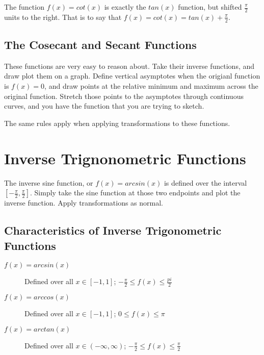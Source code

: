The function $f(x)=cot(x)$ is exactly the $tan(x)$ function, but shifted
$\frac{\pi}{2}$ units to the right.  That is to say that
$f(x)=cot(x)=tan(x)+\frac{\pi}{2}$.

\subsection{The Cosecant and Secant Functions}
These functions are very easy to reason about.  Take their inverse functions,
and draw plot them on a graph.  Define vertical asymptotes when the origianl
function is $f(x)=0$, and draw points at the relative minimum and maximum across
the original function.  Stretch those points to the asymptotes through
continuous curves, and you have the function that you are trying to sketch.

The same rules apply when applying transformations to these functions.

\section{Inverse Trignonometric Functions}
The inverse sine function, or $f(x)=arcsin(x)$ is defined over the interval
$[-\frac{\pi}{2},\frac{\pi}{2}]$.  Simply take the sine function at those two
endpoints and plot the inverse function.  Apply transformations as normal.

\subsection{Characteristics of Inverse Trigonometric Functions}
\begin{description}
  \item[$f(x)=arcsin(x)$]{Defined over all $x\in[-1,1]$; $-\frac{\pi}{2} \leq
    f(x) \leq \frac{pi}{2}$}
  \item[$f(x)=arccos(x)$]{Defined over all $x\in[-1,1]$; $0 \leq f(x) \leq \pi$}
  \item[$f(x)=arctan(x)$]{Defined over all $x\in(-\infty,\infty)$;
    $-\frac{\pi}{2} \leq f(x) \leq \frac{\pi}{2}$}
\end{description}
